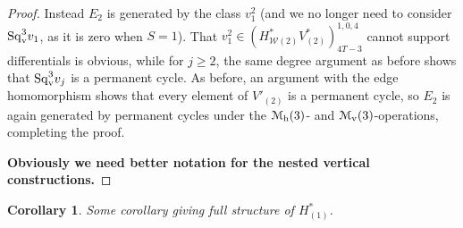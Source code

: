 \documentclass[11pt]{amsart}
\theoremstyle{plain}
\newtheorem{cor}[thm]{Corollary}
\theoremstyle{definition}
\newcommand{\calM}{\mathcal{M}}
\newcommand{\calw}{\mathcal{W}}
\newcommand{\calmv}{\mathcal{M}_\textup{v}}
\newcommand{\calmh}{\mathcal{M}_\textup{h}}
\newcommand{\calMv}{\mathcal{M}_\textup{v}}
\theoremstyle{plain}
\newcommand{\Sqv}{\mathrm{Sq}_\textup{v}}
\newcommand{\F}{\mathbb{F}}
\newcommand{\Ftwo}{\F_2}
\begin{document}
\begin{Calculations of HWn for n nonzero}
\begin{proof}
Instead $E_2$ is generated by the class $v_1^{2}$  (and we no longer need to consider $\Sqv^{3}v_1$, as it is zero when $S=1$). That $v_1^2\in(H^*_{\calw(2)}V^*_{(2)})^{1,0,4}_{4T-3}$ cannot support differentials is obvious, while for $j\geq2$, the same degree argument as before shows that $\Sqv^3v_j$ is a permanent cycle. As before, an argument with the edge homomorphism shows that every element of $V'_{(2)}$ is a permanent cycle, so $E_2$ is again generated by permanent cycles under the $\calmh(3)$- and $\calmv(3)$-operations, completing the proof.

 \textbf{Obviously we need better notation for the nested vertical constructions.}
\end{proof}

\begin{cor}
Some corollary giving full structure of $H^*_{(1)}$.
\end{cor}




\end{Calculations of HWn for n nonzero}
\end{document}
